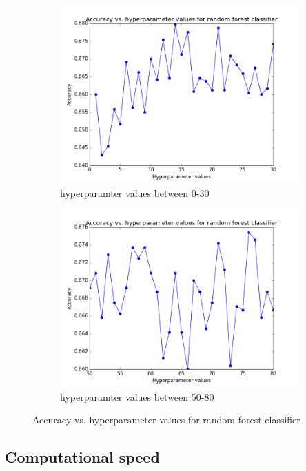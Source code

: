 \documentclass{article} %
\begin{document}
\begin{figure}[H]
\centering
\begin{subfigure}{.4\textwidth}
  \centering
  \includegraphics[width=.9\linewidth]{hyperparameter_forest_1_30.png}
  \caption{hyperparamter values between 0-30}
  \label{fig:sub3}
\end{subfigure}%
\begin{subfigure}{.4\textwidth}
  \centering
  \includegraphics[width=.9\linewidth]{hyperparameter_forest_50_81.png}
  \caption{hyperparamter values between 50-80}
  \label{fig:sub4}
\end{subfigure}
\caption{Accuracy vs. hyperparameter values for random forest classifier}
\label{fig:test2}
\end{figure}



\subsection{Computational speed}
\end{document}

